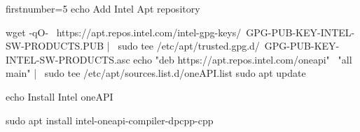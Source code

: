 \begin{bashcode*}{firstnumber=5}
echo Add Intel Apt repository

wget -qO- \
  https://apt.repos.intel.com/intel-gpg-keys/\
GPG-PUB-KEY-INTEL-SW-PRODUCTS.PUB | \
  sudo tee /etc/apt/trusted.gpg.d/\
GPG-PUB-KEY-INTEL-SW-PRODUCTS.asc
echo "deb https://apt.repos.intel.com/oneapi" \
     "all main" | \
     sudo tee /etc/apt/sources.list.d/oneAPI.list
sudo apt update
        
echo Install Intel oneAPI

sudo apt install intel-oneapi-compiler-dpcpp-cpp
\end{bashcode*}